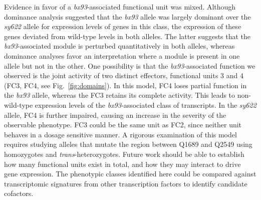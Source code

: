 \documentclass[10pt, twocolumn]{article}
\begin{document}

Evidence in favor of a \emph{bx93}-associated functional unit was mixed.
Although dominance analysis suggested that the \emph{bx93} allele was largely
dominant over the \emph{sy622} allele for expression levels of genes in this
class, the expression of these genes deviated from wild-type levels in both
alleles. The latter suggests that the \emph{bx93}-associated module is perturbed
quantitatively in both alleles, whereas dominance analyses favor an
interpretation where a module is present in one allele but not in the other. One
possibility is that the \emph{bx93}-associated function we observed is the joint
activity of two distinct effectors, functional units 3 and 4 (FC3, FC4, see
Fig.~\ref{fig:domains}). In this model, FC4 loses partial function in the
\emph{bx93} allele, whereas the FC3 retains its complete activity. This leads to
non-wild-type expression levels of the \emph{bx93}-associated class of
transcripts. In the \emph{sy622} allele, FC4 is further impaired, causing an
increase in the severity of the observable phenotype. FC3 could be the same unit
as FC2, since neither unit behaves in a dosage sensitive manner. A rigorous
examination of this model requires studying alleles that mutate the region
between Q1689 and Q2549 using homozygotes and \emph{trans}-heterozygotes. Future
work should be able to establish how many functional units exist in total, and
how they may interact to drive gene expression. The phenotypic classes
identified here could be compared against transcriptomic signatures from other
transcription factors to identify candidate cofactors.
\end{document}
